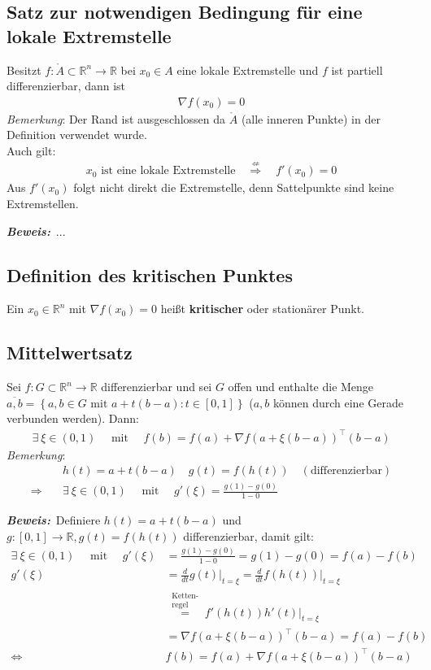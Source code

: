\documentclass[11pt,a4paper]{book}
\newcommand {\R}	{\mathbb{R}}
\newcommand {\Rn}	{\mathbb{R}^n}
\newcommand{\1}    	{\mathbbm{1}}
\newcommand{\mitt}	{\textrm{ mit }}
\newcommand{\Beweis}[1][Beweis]
{\begin{mdframed}[backgroundcolor=gray!10,linewidth=0pt]\noindent\textit{\textbf{{#1}:}}~}
\newcommand{\QED}	{\end{mdframed}}
\newcommand{\Bemerkung}	{\noindent\textit{Bemerkung}: }
\begin{document}
\subsection{Satz zur notwendigen Bedingung für eine lokale Extremstelle}
Besitzt \(f: \mathring{A} \subset \Rn \rightarrow \R \) bei \(x_0 \in A\) eine lokale Extremstelle und \(f\) ist partiell differenzierbar, dann ist
\begin{align*}
	\nabla f(x_0) = 0
\end{align*}
\textit{Bemerkung}: Der Rand ist ausgeschlossen da \(\mathring{A}\) (alle inneren Punkte) in der Definition verwendet wurde.\\
Auch gilt:
\begin{align*}
	x_0 \textrm{ ist eine lokale Extremstelle}
	\quad \stackrel{\not\Leftarrow}{\Rightarrow} \quad
	f'(x_0) = 0
\end{align*}
Aus \(f'(x_0)\) folgt nicht direkt die Extremstelle, denn Sattelpunkte sind keine Extremstellen. \\

\noindent
\Beweis ...
\QED

\subsection{Definition des kritischen Punktes}

Ein \(x_0 \in \Rn \) mit \(\nabla f(x_0) = 0\) heißt \textbf{kritischer} oder stationärer Punkt.  

\subsection{Mittelwertsatz}
Sei \(f: G \subset \Rn \rightarrow \R\) differenzierbar und sei \(G\) offen und enthalte die Menge \(\overline{a,b} = \left\{ a,b \in G \mitt  a + t(b-a) : t \in [0,1] \right\}\) (\(a,b\) können durch eine Gerade verbunden werden). Dann:
\begin{align*}
	\exists~ \xi \in (0,1)\quad\mitt\quad f(b) = f(a) + \nabla f(a + \xi(b-a))^\top (b-a) 
\end{align*}
\Bemerkung
\begin{align*}
	& h(t) = a + t(b-a) \quad
	g(t) = f(h(t)) \quad (\textrm{differenzierbar}) \\
	\Rightarrow \quad & \exists~ \xi \in (0,1)\quad\mitt\quad g'(\xi) = \frac{g(1) - g(0)}{1-0}
\end{align*}
\Beweis Definiere \(h(t) = a + t(b-a)\) und \(g: [0,1] \rightarrow \R, g(t) = f(h(t))\) differenzierbar, damit gilt:
\begin{align*}
	\exists~ \xi \in (0,1) \quad\mitt\quad g'(\xi) &= \frac{g(1) - g(0)}{1 - 0} = g(1) - g(0) = f(a) - f(b) \\
	g'(\xi) &= \frac{d}{dt} g(t) \vert_{t = \xi} = \frac{d}{dt} f(h(t)) \vert_{t = \xi} \\
	&\stackrel{\substack{\textrm{Ketten-}\\\textrm{regel}}}{=} f'(h(t))h'(t) \vert_{t = \xi} \\
	&= \nabla f( a + \xi(b-a) )^\top (b-a) = f(a) - f(b) \\
	\Leftrightarrow \quad& f(b) = f(a) + \nabla f( a + \xi(b-a) )^\top (b-a)
\end{align*}
\QED
\end{document}
